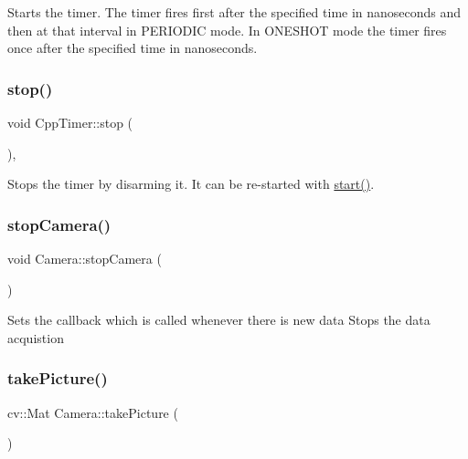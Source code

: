 Starts the timer. The timer fires first after the specified time in nanoseconds and then at that interval in P\+E\+R\+I\+O\+D\+IC mode. In O\+N\+E\+S\+H\+OT mode the timer fires once after the specified time in nanoseconds. \mbox{\label{classCppTimer_a4bb95ddee98a536d0818b8f6096bf7e7}} 
\subsubsection{\texorpdfstring{stop()}{stop()}}
{\footnotesize\ttfamily void Cpp\+Timer\+::stop (\begin{DoxyParamCaption}{ }\end{DoxyParamCaption})\hspace{0.3cm}{\ttfamily [virtual]}, {\ttfamily [inherited]}}

Stops the timer by disarming it. It can be re-\/started with \hyperlink{classCppTimer_a64989025caa3c030c6c397ca76a2d20b}{start()}. \mbox{\label{classCamera_aac0e2e17954d17a0c15019ca74149f15}} 
\subsubsection{\texorpdfstring{stop\+Camera()}{stopCamera()}}
{\footnotesize\ttfamily void Camera\+::stop\+Camera (\begin{DoxyParamCaption}{ }\end{DoxyParamCaption})\hspace{0.3cm}{\ttfamily [inline]}}

Sets the callback which is called whenever there is new data Stops the data acquistion \mbox{\label{classCamera_a07670e99337fb322375a412222c06ada}} 
\subsubsection{\texorpdfstring{take\+Picture()}{takePicture()}}
{\footnotesize\ttfamily cv\+::\+Mat Camera\+::take\+Picture (\begin{DoxyParamCaption}{ }\end{DoxyParamCaption})}

